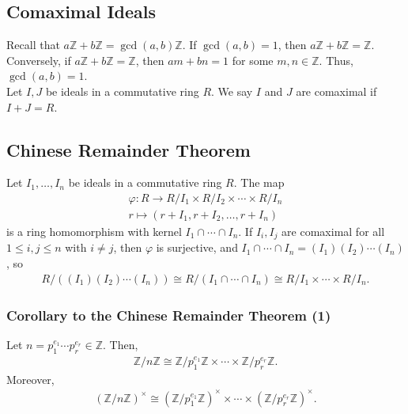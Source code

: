 \documentclass[8pt]{extarticle}
\newcommand{\Z}{\mathbb{Z}}
\begin{document}
   \subsection{Comaximal Ideals}%
   Recall that $a\Z + b\Z = \gcd(a,b)\Z$. If $\gcd(a,b) = 1$, then $a\Z + b\Z = \Z$. Conversely, if $a\Z + b\Z = \Z$, then $am + bn = 1$ for some $m,n\in\Z$. Thus, $\gcd(a,b) = 1$.\\

   Let $I,J$ be ideals in a commutative ring $R$. We say $I$ and $J$ are comaximal if $I+J = R$.
   \subsection{Chinese Remainder Theorem}%
   Let $I_1,\dots,I_n$ be ideals in a commutative ring $R$. The map
   \begin{align*}
     \varphi: R\rightarrow R/I_1 \times R/I_2\times \cdots \times R/I_n\\
     r \mapsto (r + I_1,r+I_2,\dots,r+I_n)
   \end{align*}
   is a ring homomorphism with kernel $I_1\cap \cdots \cap I_n$. If $I_i,I_j$ are comaximal for all $1\leq i,j\leq n$ with $i\neq j$, then $\varphi$ is surjective, and $I_1\cap \cdots \cap I_n = (I_1)(I_2)\cdots(I_n)$, so
   \begin{align*}
     R/\left((I_1)(I_2)\cdots(I_n)\right) \cong R/(I_1\cap \cdots \cap I_n) \cong R/I_1\times\cdots\times R/I_n.
   \end{align*}
   \subsubsection{Corollary to the Chinese Remainder Theorem (1)}%
   Let $n = p_1^{e_1}\cdots p_r^{e_r}\in \Z$. Then,
   \begin{align*}
     \Z/n\Z \cong \Z/p_1^{e_1}\Z \times \cdots \times \Z/p_{r}^{e_r}\Z.
   \end{align*}
   Moreover,
   \begin{align*}
     \left(\Z/n\Z\right)^{\times} \cong \left(\Z/p_1^{e_1}\Z\right)^{\times} \times \cdots \times \left(\Z/p_{r}^{e_r}\Z\right)^{\times}.
   \end{align*}
\end{document}
